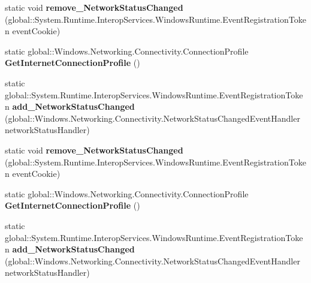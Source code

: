 \begin{DoxyCompactItemize}
\item 
\mbox{\label{class_windows_1_1_networking_1_1_connectivity_1_1_network_information_aad4fa814d8c0a7442a2b4a5a3612769b}} 
static void {\bfseries remove\+\_\+\+Network\+Status\+Changed} (global\+::\+System.\+Runtime.\+Interop\+Services.\+Windows\+Runtime.\+Event\+Registration\+Token event\+Cookie)
\item 
\mbox{\label{class_windows_1_1_networking_1_1_connectivity_1_1_network_information_af317b5fe993850e01a074abcd5e23f43}} 
static global\+::\+Windows.\+Networking.\+Connectivity.\+Connection\+Profile {\bfseries Get\+Internet\+Connection\+Profile} ()
\item 
\mbox{\label{class_windows_1_1_networking_1_1_connectivity_1_1_network_information_a43b6769b13c9e0b4a31e028e8d785cca}} 
static global\+::\+System.\+Runtime.\+Interop\+Services.\+Windows\+Runtime.\+Event\+Registration\+Token {\bfseries add\+\_\+\+Network\+Status\+Changed} (global\+::\+Windows.\+Networking.\+Connectivity.\+Network\+Status\+Changed\+Event\+Handler network\+Status\+Handler)
\item 
\mbox{\label{class_windows_1_1_networking_1_1_connectivity_1_1_network_information_aad4fa814d8c0a7442a2b4a5a3612769b}} 
static void {\bfseries remove\+\_\+\+Network\+Status\+Changed} (global\+::\+System.\+Runtime.\+Interop\+Services.\+Windows\+Runtime.\+Event\+Registration\+Token event\+Cookie)
\item 
\mbox{\label{class_windows_1_1_networking_1_1_connectivity_1_1_network_information_af317b5fe993850e01a074abcd5e23f43}} 
static global\+::\+Windows.\+Networking.\+Connectivity.\+Connection\+Profile {\bfseries Get\+Internet\+Connection\+Profile} ()
\item 
\mbox{\label{class_windows_1_1_networking_1_1_connectivity_1_1_network_information_a43b6769b13c9e0b4a31e028e8d785cca}} 
static global\+::\+System.\+Runtime.\+Interop\+Services.\+Windows\+Runtime.\+Event\+Registration\+Token {\bfseries add\+\_\+\+Network\+Status\+Changed} (global\+::\+Windows.\+Networking.\+Connectivity.\+Network\+Status\+Changed\+Event\+Handler network\+Status\+Handler)

\end{DoxyCompactItemize}
